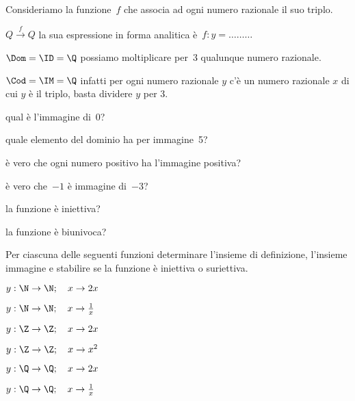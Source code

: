 \begin{esercizio}
 \label{ese:D.10}
Consideriamo la funzione~\(f\) che associa ad ogni numero razionale il suo 
triplo.

\(Q\overset{{f}}{{\rightarrow }}Q\) la sua espressione in forma
analitica è~\(f: y = {\dots}{\dots}{\dots}\)

\(\Dom = \ID = \Q\) possiamo moltiplicare per~3 qualunque numero razionale.

\(\Cod = \IM =\Q\) infatti per ogni numero razionale \(y\) c'è un numero 
razionale \(x\) di cui \(y\) è il triplo, basta dividere \(y\) per 3.
%
\vspace{-6pt}
\begin{enumeratea}
\item qual è l'immagine di~0?\dotfill
\item quale elemento del dominio ha per immagine~5?\dotfill
\item è vero che ogni numero positivo ha l'immagine positiva?\dotfill
\item è vero che~\(-1\) è immagine di~\(-3\)?\dotfill
\item la funzione è iniettiva?
\item la funzione è biunivoca?
\end{enumeratea}
\end{esercizio}

\newpage %

\begin{esercizio}
 \label{ese:D.11}
Per ciascuna delle seguenti funzioni determinare l'insieme di definizione, 
l'insieme
immagine e stabilire se la funzione è iniettiva o suriettiva.
\begin{multicols}{3}
\begin{enumeratea}
\item \(y:\N\rightarrow\N;\quad x \rightarrow 2x\)
\item \(y:\N\rightarrow\N;\quad x \rightarrow \frac{1}{x}\)
\item \(y:\Z\rightarrow\Z;\quad x \rightarrow 2x\)
\item \(y:\Z\rightarrow\Z;\quad x \rightarrow x^{2}\)
\item \(y:\Q\rightarrow\Q;\quad x \rightarrow 2x\)
\item \(y:\Q\rightarrow\Q;\quad x \rightarrow \frac{1}{x}\)
\end{enumeratea}
\end{multicols}
\end{esercizio}

